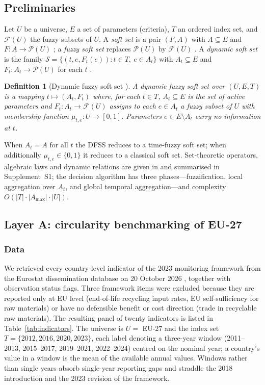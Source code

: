 \documentclass[a4paper,fleqn]{cas-sc}
\newtheorem{definition}{Definition}
\begin{document}
\subsection{Preliminaries}
Let $U$ be a universe, $E$ a set of parameters (criteria), $T$ an ordered index set, and $\mathcal{F}(U)$ the fuzzy subsets of $U$. A \emph{soft set} is a pair $(F,A)$ with $A\subseteq E$ and $F:A\to\mathcal{P}(U)$ \citep{molodtsov1999}; a \emph{fuzzy soft set} replaces $\mathcal{P}(U)$ by $\mathcal{F}(U)$ \citep{maji2001fss}. A \emph{dynamic soft set} is the family $\mathcal{S}=\{(t,e,F_t(e)):t\in T,\ e\in A_t\}$ with $A_t\subseteq E$ and $F_t:A_t\to\mathcal{P}(U)$ for each $t$ \citep{saeed2025introduction}.
\begin{definition}[Dynamic fuzzy soft set \citep{SAEED2026200504}]
A dynamic fuzzy soft set over $(U,E,T)$ is a mapping $t\mapsto(A_t,F_t)$ where, for each $t\in T$, $A_t\subseteq E$ is the set of active parameters and $F_t:A_t\to\mathcal{F}(U)$ assigns to each $e\in A_t$ a fuzzy subset of $U$ with membership function $\mu_{t,e}:U\to[0,1]$. Parameters $e\in E\setminus A_t$ carry no information at $t$.
\end{definition}
When $A_t=A$ for all $t$ the DFSS reduces to a time-fuzzy soft set; when additionally $\mu_{t,e}\in\{0,1\}$ it reduces to a classical soft set. Set-theoretic operators, algebraic laws and dynamic relations are given in \citet{saeed2025introduction,SAEED2026200504} and summarised in Supplement~S1; the decision algorithm has three phases---fuzzification, local aggregation over $A_t$, and global temporal aggregation---and complexity $O(|T|\cdot|A_{\max}|\cdot|U|)$.

\subsection{Layer A: circularity benchmarking of EU-27}\label{sec:layerA}
\subsubsection{Data} We retrieved every country-level indicator of the 2023 monitoring framework from the Eurostat dissemination database on 20 October 2026 \citep{eurostat_cei}, together with observation status flags. Three framework items were excluded because they are reported only at EU level (end-of-life recycling input rates, EU self-sufficiency for raw materials) or have no defensible benefit or cost direction (trade in recyclable raw materials). The resulting panel of twenty indicators is listed in Table~\ref{tab:indicators}. The universe is $U=$ EU-27 and the index set $T=\{2012,2016,2020,2023\}$, each label denoting a three-year window (2011--2013, 2015--2017, 2019--2021, 2022--2024) centred on the nominal year; a country's value in a window is the mean of the available annual values. Windows rather than single years absorb single-year reporting gaps and straddle the 2018 introduction and the 2023 revision of the framework.
\end{document}
